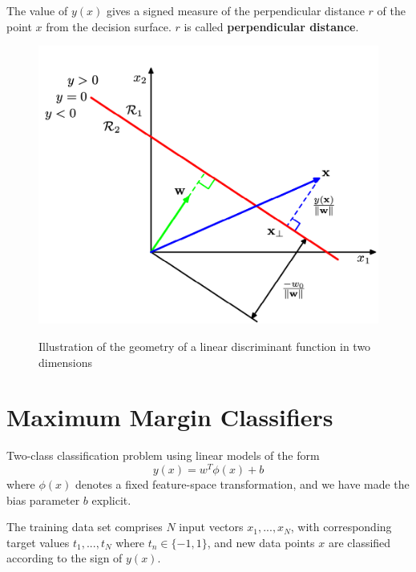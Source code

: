 The value of $y(x)$ gives a signed measure of the perpendicular distance $r$ of the point $x$ from the decision surface. $r$ is called \textbf{perpendicular distance}.

\begin{figure}
    \centering
    \includegraphics[scale=0.3]{chapter005/figures/fig003}
    \label{fig: geometry of a linear discriminant function}
    \caption{Illustration of the geometry of a linear discriminant function in two dimensions}
\end{figure}

\section{Maximum Margin Classifiers}

\begin{definition}
    Two-class classification problem using linear models of the form
    \begin{equation}
        \label{svm linear model}
        y(x)=w^T \phi (x) + b
    \end{equation}
    where $\phi (x)$ denotes a fixed feature-space transformation, and we have made the bias parameter $b$ explicit.
\end{definition}

The training data set comprises $N$ input vectors $x_1, ..., x_N$, with corresponding target values $t_1, ..., t_N$ where $t_n \in \{-1, 1\}$, and new data points $x$ are classified according to the sign of $y(x)$.


